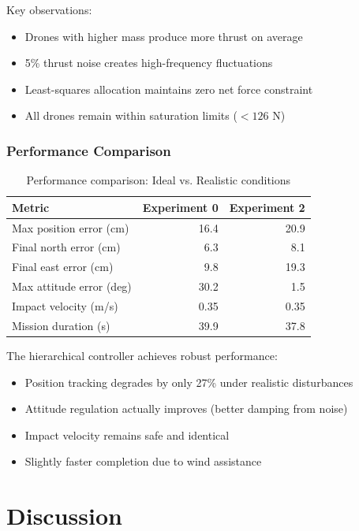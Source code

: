 \documentclass[12pt,a4paper]{article}
\begin{document}
Key observations:
\begin{itemize}
    \item Drones with higher mass produce more thrust on average
    \item 5\% thrust noise creates high-frequency fluctuations
    \item Least-squares allocation maintains zero net force constraint
    \item All drones remain within saturation limits ($< 126$ N)
\end{itemize}

\subsubsection{Performance Comparison}

\begin{table}[h]
\centering
\caption{Performance comparison: Ideal vs. Realistic conditions}
\begin{tabular}{lrr}
\toprule
\textbf{Metric} & \textbf{Experiment 0} & \textbf{Experiment 2} \\
\midrule
Max position error (cm) & 16.4 & 20.9 \\
Final north error (cm) & 6.3 & 8.1 \\
Final east error (cm) & 9.8 & 19.3 \\
Max attitude error (deg) & 30.2 & 1.5 \\
Impact velocity (m/s) & 0.35 & 0.35 \\
Mission duration (s) & 39.9 & 37.8 \\
\bottomrule
\end{tabular}
\label{tab:exp_comparison}
\end{table}

The hierarchical controller achieves robust performance:
\begin{itemize}
    \item Position tracking degrades by only 27\% under realistic disturbances
    \item Attitude regulation actually improves (better damping from noise)
    \item Impact velocity remains safe and identical
    \item Slightly faster completion due to wind assistance
\end{itemize}


\section{Discussion}
\end{document}
